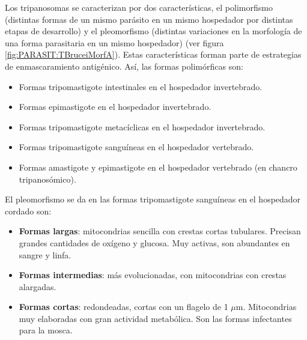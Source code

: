 Los tripanosomas se caracterizan por dos características, el polimorfismo (distintas formas de un mismo parásito en un mismo hospedador por distintas etapas de desarrollo) y el pleomorfismo (distintas variaciones en la morfología de una forma parasitaria en un mismo hospedador) (ver figura \ref{fig:PARASIT:TBruceiMorfA}). Estas características forman parte de estrategias de enmascaramiento antigénico. Así, las formas polimórficas son:
\begin{itemize}[itemsep=0pt,parsep=0pt,topsep=0pt,partopsep=0pt]
	\item Formas tripomastigote intestinales en el hospedador invertebrado.
	\item Formas epimastigote en el hospedador invertebrado.
	\item Formas tripomastigote metacíclicas en el hospedador invertebrado.
	\item Formas tripomastigote sanguíneas en el hospedador vertebrado.
	\item Formas amastigote y epimastigote en el hospedador vertebrado (en chancro tripanosómico).
\end{itemize}
El pleomorfismo se da en las formas tripomastigote sanguíneas en el hospedador cordado son:
\begin{itemize}[itemsep=0pt,parsep=0pt,topsep=0pt,partopsep=0pt]
	\item \textbf{Formas largas}: mitocondrias sencilla con crestas cortas tubulares. Precisan grandes cantidades de oxígeno y glucosa. Muy activas, son abundantes en sangre y linfa.
	\item \textbf{Formas intermedias}: más evolucionadas, con mitocondrias con crestas alargadas.
	\item \textbf{Formas cortas}: redondeadas, cortas con un flagelo de 1 $\mu$m. Mitocondrias muy elaboradas con gran actividad metabólica. Son las formas infectantes para la mosca.
\end{itemize}
